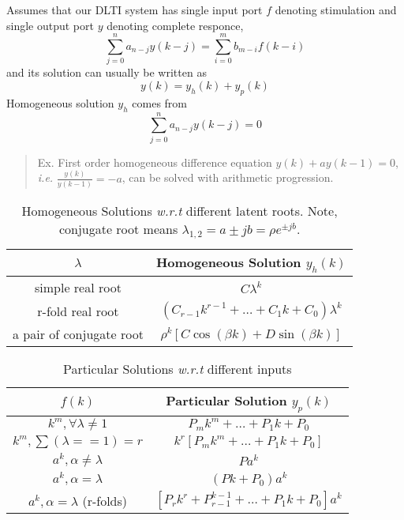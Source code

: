  Assumes that our DLTI system has single input port $f$ denoting stimulation
 and single output port $y$ denoting complete responce,
 \[ \sum_{j=0}^n a_{n-j} y(k-j) = \sum_{i=0}^m b_{m-i} f(k-i) \]
 and its solution can usually be written as
 \[ y(k) = y_h(k) + y_p(k) \]
 Homogeneous solution $y_h$ comes from
 \[ \sum_{j=0}^n a_{n-j} y(k-j) = 0 \]

 \begin{quote}
	 Ex. First order homogeneous difference equation $y(k) + ay(k-1) = 0$,
	 \emph{i.e.} $\frac{y(k)}{y(k-1)} = -a$, can be solved with arithmetic
	 progression.
 \end{quote}

 \begin{table}[!h]
	 \begin{center}
		 \begin{tabular}{|c|c|}
			 \hline
			 $\lambda$ & Homogeneous Solution $y_h(k)$\\
			 \hline\hline
			 simple real root   & $C\lambda^k $ \\
			 r-fold real root   & $(C_{r-1}k^{r-1}+ \ldots + C_1 k + C_0) \lambda^k$ \\
			 a pair of conjugate root & $\rho^k[C\cos(\beta k)+D\sin(\beta k)]$ \\
			 \hline
		 \end{tabular}
		 \caption{Homogeneous Solutions \emph{w.r.t} different latent roots.
		 Note, conjugate root means $\lambda_{1,2} = a\pm jb = \rho e^{\pm jb}$.}
	 \end{center}
 \end{table}
 \begin{table}[!h]
	 \begin{center}
		 \begin{tabular}{|c|c|}
			 \hline
			 $f(k)$ & Particular Solution $y_p(k)$\\
			 \hline\hline
			 $k^m, \forall \lambda \neq 1$   & $P_m k^m + \ldots + P_1 k + P_0$ \\
			 $k^m, \sum(\lambda==1)=r$   & $k^r[P_m k^m + \ldots + P_1 k + P_0]$ \\
			 $a^k, \alpha \neq \lambda$ & $Pa^k$\\
			 $a^k, \alpha = \lambda$ & $(Pk + P_0)a^k$\\
			 $a^k, \alpha = \lambda$ (r-folds) & $[P_rk^r + P_{r-1}^{k-1}
		 		+ \ldots + P_1k + P_0]a^k$\\
			 \hline
		 \end{tabular}
		 \caption{Particular Solutions \emph{w.r.t} different inputs}
	 \end{center}
 \end{table}

